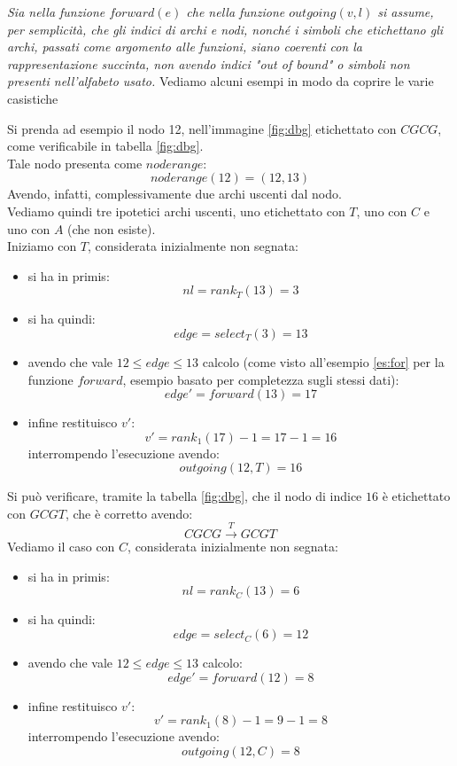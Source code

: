 \documentclass[a4paper,12pt, oneside]{book}
\begin{document}
\textit{Sia nella funzione $forward(e)$ che nella funzione $outgoing(v,l)$ si
  assume, per semplicità, che gli indici di archi e nodi, nonché i simboli che
  etichettano gli archi, passati come argomento alle funzioni, siano coerenti
  con la rappresentazione succinta, non avendo indici "out of bound" o simboli
  non presenti nell'alfabeto usato.} 
\newpage
\noindent
Vediamo alcuni esempi in modo da coprire le varie casistiche
\begin{esempio}
  Si prenda ad esempio il nodo 12, nell'immagine \ref{fig:dbg} etichettato con
  $CGCG$, come verificabile in tabella \ref{fig:dbg}.\\
  Tale nodo presenta come $noderange$:
  \[noderange(12)= (12,13)\]
  Avendo, infatti, complessivamente due archi uscenti dal nodo.\\
  Vediamo quindi tre ipotetici archi uscenti, uno etichettato con $T$, uno con
  $C$ e uno con $A$ (che non esiste).\\
  Iniziamo con $T$, considerata inizialmente non segnata:
  \begin{itemize}
    \item si ha in primis:
    \[nl=rank_T(13)=3\]
    \item si ha quindi:
    \[edge = select_T(3)=13\]
    \item avendo che vale $12\leq edge \leq 13$ calcolo (come visto all'esempio
    \ref{es:for} per la funzione $forward$, esempio basato per completezza sugli
    stessi dati): 
    \[edge' = forward(13)=17\]
    \item infine restituisco $v'$:
    \[v'=rank_1(17)-1= 17-1 = 16\]
    interrompendo l'esecuzione avendo:
    \[outgoing(12,T)=16\]
  \end{itemize}
  Si può verificare, tramite la tabella \ref{fig:dbg}, che il nodo di indice
  $16$ è etichettato con $GCGT$, che è corretto avendo:
  \[CGCG\stackrel{T}{\to}GCGT\]
  Vediamo il caso con $C$, considerata inizialmente non segnata:
  \begin{itemize}
    \item si ha in primis:
    \[nl=rank_C(13)=6\]
    \item si ha quindi:
    \[edge = select_C(6)=12\]
    \item avendo che vale $12\leq edge \leq 13$ calcolo:
    \[edge' = forward(12)=8\]
    \item infine restituisco $v'$:
    \[v'=rank_1(8)-1= 9-1 = 8\]
    interrompendo l'esecuzione avendo:
    \[outgoing(12,C)=8\]
  \end{itemize}

\end{esempio}
\end{document}
